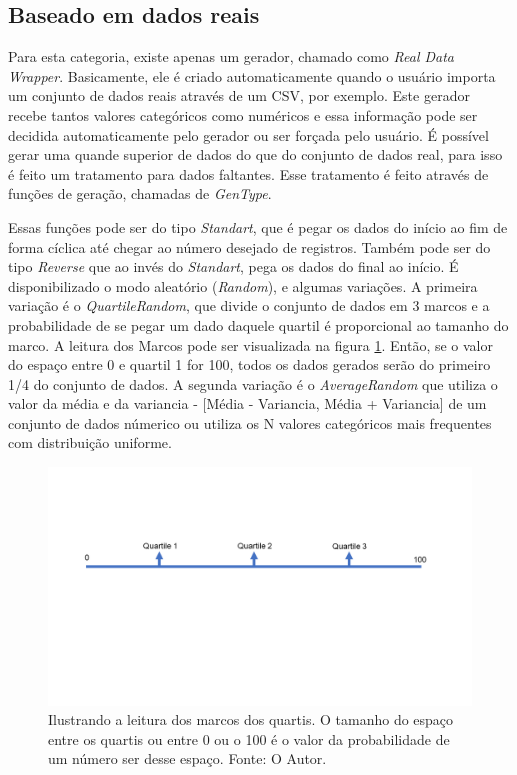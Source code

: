 \documentclass[
	12pt,				%
	openright,			%
	twoside,			%
	a4paper,			%
	english,			%
	brazil				%
	]{abntex2}
\begin{document}
		\subsection{Baseado em dados reais}
		Para esta categoria, existe apenas um gerador, chamado como \emph{Real Data Wrapper}.
		Basicamente, ele é criado automaticamente quando o usuário importa um conjunto de dados reais através de um CSV, por exemplo.
		Este gerador recebe tantos valores categóricos como numéricos e essa informação pode ser decidida automaticamente pelo gerador ou ser forçada pelo usuário.
		É possível gerar uma quande superior de dados do que do conjunto de dados real, para isso é feito um tratamento para dados faltantes.
		Esse tratamento é feito através de funções de geração, chamadas de \emph{GenType}.
		\par
		Essas funções pode ser do tipo \emph{Standart}, que é pegar os dados do início ao fim de forma cíclica até chegar ao número desejado de registros.
		Também pode ser do tipo \emph{Reverse} que ao invés do \emph{Standart}, pega os dados do final ao início.
		É disponibilizado o modo aleatório (\emph{Random}), e algumas variações.
		A primeira variação é o \emph{QuartileRandom}, que divide o conjunto de dados em 3 marcos e a probabilidade de se pegar um dado daquele quartil é proporcional ao tamanho do marco.
		A leitura dos Marcos pode ser visualizada na figura \ref{fig:leituraMarco}. Então, se o valor do espaço entre 0 e quartil 1 for 100, todos os dados gerados serão do primeiro 1/4 do conjunto de dados.
		A segunda variação é o \emph{AverageRandom} que utiliza o valor da média e da variancia - [Média - Variancia, Média + Variancia] de um conjunto de dados númerico ou utiliza os N valores categóricos mais frequentes com distribuição uniforme.
		\begin{figure}[h]
			\centering
			\includegraphics[width=\linewidth]{./figures/TrabalhosRelacionados/quartil.png}
			\caption{Ilustrando a leitura dos marcos dos quartis. O tamanho do espaço entre os quartis ou entre 0 ou o 100 é o valor da probabilidade de um número ser desse espaço. Fonte: O Autor.}
			\label{fig:leituraMarco}
		\end{figure}
\end{document}

